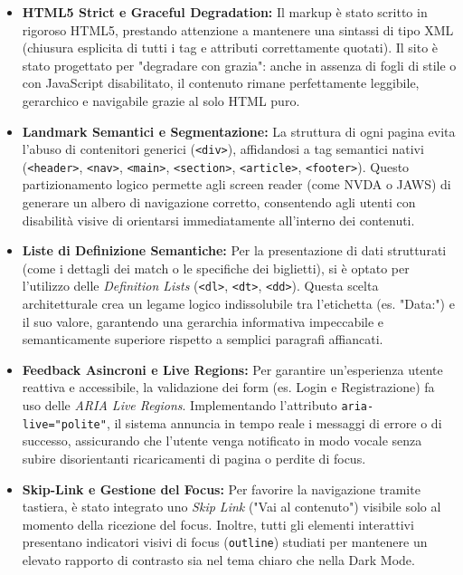 \documentclass[11pt,a4paper]{article}
\begin{document}
\begin{itemize}
    \item \textbf{HTML5 Strict e Graceful Degradation:} Il markup è stato scritto in rigoroso HTML5, prestando attenzione a mantenere una sintassi di tipo XML (chiusura esplicita di tutti i tag e attributi correttamente quotati). Il sito è stato progettato per "degradare con grazia": anche in assenza di fogli di stile o con JavaScript disabilitato, il contenuto rimane perfettamente leggibile, gerarchico e navigabile grazie al solo HTML puro.
    \item \textbf{Landmark Semantici e Segmentazione:} La struttura di ogni pagina evita l'abuso di contenitori generici (\texttt{<div>}), affidandosi a tag semantici nativi (\texttt{<header>}, \texttt{<nav>}, \texttt{<main>}, \texttt{<section>}, \texttt{<article>}, \texttt{<footer>}). Questo partizionamento logico permette agli screen reader (come NVDA o JAWS) di generare un albero di navigazione corretto, consentendo agli utenti con disabilità visive di orientarsi immediatamente all'interno dei contenuti.
    
    \item \textbf{Liste di Definizione Semantiche:} Per la presentazione di dati strutturati (come i dettagli dei match o le specifiche dei biglietti), si è optato per l'utilizzo delle \textit{Definition Lists} (\texttt{<dl>}, \texttt{<dt>}, \texttt{<dd>}). Questa scelta architetturale crea un legame logico indissolubile tra l'etichetta (es. "Data:") e il suo valore, garantendo una gerarchia informativa impeccabile e semanticamente superiore rispetto a semplici paragrafi affiancati.
    
    \item \textbf{Feedback Asincroni e Live Regions:} Per garantire un'esperienza utente reattiva e accessibile, la validazione dei form (es. Login e Registrazione) fa uso delle \textit{ARIA Live Regions}. Implementando l'attributo \texttt{aria-live="polite"}, il sistema annuncia in tempo reale i messaggi di errore o di successo, assicurando che l'utente venga notificato in modo vocale senza subire disorientanti ricaricamenti di pagina o perdite di focus.
    
    \item \textbf{Skip-Link e Gestione del Focus:} Per favorire la navigazione tramite tastiera, è stato integrato uno \textit{Skip Link} ("Vai al contenuto") visibile solo al momento della ricezione del focus. Inoltre, tutti gli elementi interattivi presentano indicatori visivi di focus (\texttt{outline}) studiati per mantenere un elevato rapporto di contrasto sia nel tema chiaro che nella Dark Mode.
    

\end{itemize}
\end{document}
